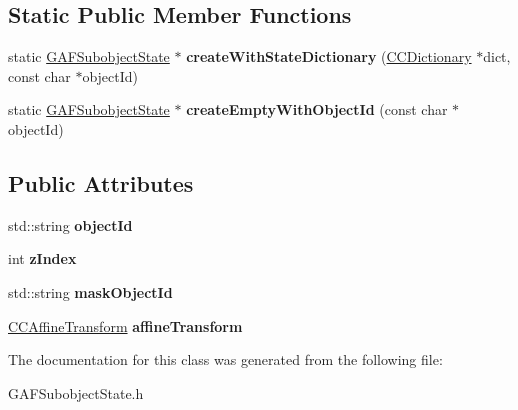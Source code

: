 \subsection*{Static Public Member Functions}
\begin{DoxyCompactItemize}
\item 
\hypertarget{class_g_a_f_1_1_g_a_f_subobject_state_abf01d75392777d5042ef902a6e8d424d}{static \hyperlink{class_g_a_f_1_1_g_a_f_subobject_state}{G\-A\-F\-Subobject\-State} $\ast$ {\bfseries create\-With\-State\-Dictionary} (\hyperlink{class_g_a_f_1_1_c_c_dictionary}{C\-C\-Dictionary} $\ast$dict, const char $\ast$object\-Id)}\label{class_g_a_f_1_1_g_a_f_subobject_state_abf01d75392777d5042ef902a6e8d424d}

\item 
\hypertarget{class_g_a_f_1_1_g_a_f_subobject_state_aa75f07b37f8e3cd36b35f0ec404c25f6}{static \hyperlink{class_g_a_f_1_1_g_a_f_subobject_state}{G\-A\-F\-Subobject\-State} $\ast$ {\bfseries create\-Empty\-With\-Object\-Id} (const char $\ast$object\-Id)}\label{class_g_a_f_1_1_g_a_f_subobject_state_aa75f07b37f8e3cd36b35f0ec404c25f6}

\end{DoxyCompactItemize}
\subsection*{Public Attributes}
\begin{DoxyCompactItemize}
\item 
\hypertarget{class_g_a_f_1_1_g_a_f_subobject_state_ad0d50c5a7e6b321a72bbf24dbf6199dd}{std\-::string {\bfseries object\-Id}}\label{class_g_a_f_1_1_g_a_f_subobject_state_ad0d50c5a7e6b321a72bbf24dbf6199dd}

\item 
\hypertarget{class_g_a_f_1_1_g_a_f_subobject_state_aec77797540e84579a64373a032abc234}{int {\bfseries z\-Index}}\label{class_g_a_f_1_1_g_a_f_subobject_state_aec77797540e84579a64373a032abc234}

\item 
\hypertarget{class_g_a_f_1_1_g_a_f_subobject_state_a083db321fc5887ef866e946e5807c6c6}{std\-::string {\bfseries mask\-Object\-Id}}\label{class_g_a_f_1_1_g_a_f_subobject_state_a083db321fc5887ef866e946e5807c6c6}

\item 
\hypertarget{class_g_a_f_1_1_g_a_f_subobject_state_aa2102cfe9627c7ac880063f303066229}{\hyperlink{class_g_a_f_1_1_c_c_affine_transform}{C\-C\-Affine\-Transform} {\bfseries affine\-Transform}}\label{class_g_a_f_1_1_g_a_f_subobject_state_aa2102cfe9627c7ac880063f303066229}

\end{DoxyCompactItemize}


The documentation for this class was generated from the following file\-:\begin{DoxyCompactItemize}
\item 
G\-A\-F\-Subobject\-State.\-h\end{DoxyCompactItemize}
